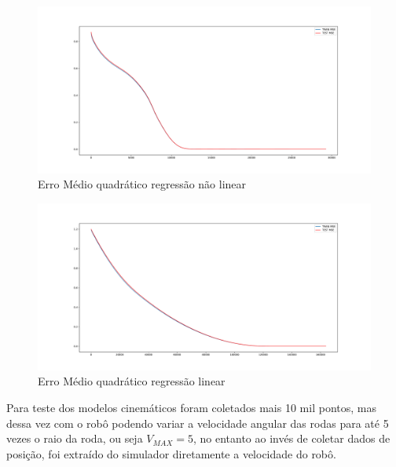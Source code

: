 \begin{figure}[H]
    \label{fig:error:quadratico:nao:linear}
    \centering
    \includegraphics[scale=0.3]{figuras/MSE_error_non_linear.pdf}
    \caption{Erro Médio quadrático regressão não linear}
\end{figure}

\begin{figure}[H]
    \label{fig:error:quadratico:linear}
    \centering
    \includegraphics[scale=0.3]{figuras/mse_error_linear.pdf}
    \caption{Erro Médio quadrático regressão linear}
\end{figure}

Para teste dos modelos cinemáticos foram coletados mais 10 mil pontos,
mas dessa vez com o robô podendo variar a velocidade angular das rodas
para até 5 vezes o raio da roda, ou seja $V_{MAX}=5$, no entanto ao invés
de coletar dados de posição, foi extraído do simulador diretamente a
velocidade do robô.


